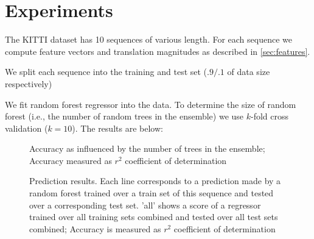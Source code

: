 \documentclass{article}
\begin{document}
\section{Experiments}

The KITTI dataset has 10 sequences of various length.  For each
sequence we compute feature vectors and translation magnitudes as
described in \ref{sec:features}.

We split each sequence into the training and test set ($.9/.1$ of data
size respectively)

We fit random forest regressor into the data.  To determine the size
of random forest (i.e., the number of random trees in the ensemble) we
use $k$-fold cross validation ($k=10$). The results are below:

\begin{figure}
  \centering
  
  \label{fig:cv}
  \caption{Accuracy as influenced by the number of trees in the ensemble; Accuracy measured as $r^2$ coefficient of determination}
\end{figure}

\begin{figure}
  \centering
  
  \label{fig:cv}
  \caption{Prediction results.  Each line corresponds to a prediction made by a random forest trained over a train set of this sequence and tested over a corresponding test set. 'all' shows a score of a regressor trained over all training sets combined and tested over all test sets combined; Accuracy is measured as $r^2$ coefficient of determination}
\end{figure}
\end{document}
